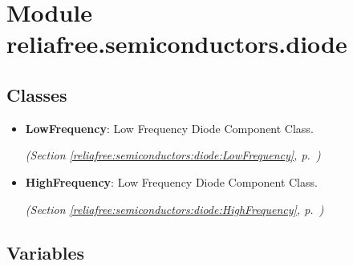 %
%
%


\section{Module reliafree.semiconductors.diode}

    \label{reliafree:semiconductors:diode}


\subsection{Classes}

\begin{itemize}  \setlength{\parskip}{0ex}
  \item \textbf{LowFrequency}: Low Frequency Diode Component Class.



  \textit{(Section \ref{reliafree:semiconductors:diode:LowFrequency}, p.~\pageref{reliafree:semiconductors:diode:LowFrequency})}

  \item \textbf{HighFrequency}: Low Frequency Diode Component Class.



  \textit{(Section \ref{reliafree:semiconductors:diode:HighFrequency}, p.~\pageref{reliafree:semiconductors:diode:HighFrequency})}

\end{itemize}


  \subsection{Variables}

